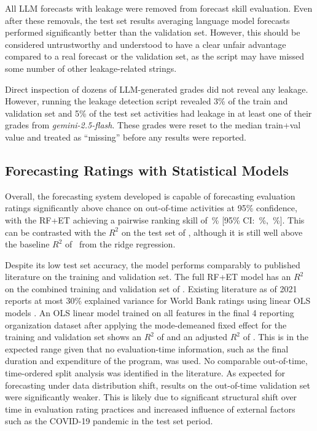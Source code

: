 \documentclass[12pt,a4paper]{article}
\let\citep\parencite
\begin{document}
All LLM forecasts with leakage were removed from forecast skill evaluation. Even after these removals, the test set results averaging language model forecasts performed significantly better than the validation set. However, this should be considered untrustworthy and understood to have a clear unfair advantage compared to a real forecast or the validation set, as the script may have missed some number of other leakage-related strings. 

Direct inspection of dozens of LLM-generated grades did not reveal any leakage. However, running the leakage detection script revealed 3\% of the train and validation set and 5\% of the test set activities had leakage in at least one of their grades from \emph{gemini-2.5-flash}. These grades were reset to the median train+val value and treated as ``missing'' before any results were reported.


\subsection{Forecasting Ratings with Statistical Models} \label{sub:forecasting_ratings_with_statistical_models}
Overall, the forecasting system developed is capable of forecasting evaluation ratings significantly above chance on out-of-time activities at 95\% confidence, with the RF+ET achieving a pairwise ranking skill of \PairwiseModel\,\% [95\% CI: \PairwiseCILow\,\%, \PairwiseCIHigh\,\%]. This can be contrasted with the $R^2$ on the test set of \Rsqheldoutratingsllmfeatures, although it is still well above the baseline $R^2$ of \Rsqheldoutridgebaseline\ from the ridge regression.

Despite its low test set accuracy, the model performs comparably to published literature on the training and validation set. The full RF+ET model has an $R^2$ on the combined training and validation set of \RsqTraining{}. Existing literature as of 2021 reports at most 30\% explained variance for World Bank ratings using linear OLS models \citep{ashtonPuzzleMissingPieces2023}. An OLS linear model trained on all features in the final 4 reporting organization dataset after applying the mode-demeaned fixed effect for the training and validation set shows an $R^2$ of \RsqTrainingOLS{} and an adjusted $R^2$ of \RsqAdjTrainingOLS{}. This is in the expected range given that no evaluation-time information, such as the final duration and expenditure of the program, was used. No comparable out-of-time, time-ordered split analysis was identified in the literature. As expected for forecasting under data distribution shift, results on the out-of-time validation set were significantly weaker. This is likely due to significant structural shift over time in evaluation rating practices and increased influence of external factors such as the COVID-19 pandemic in the test set period.
\end{document}
